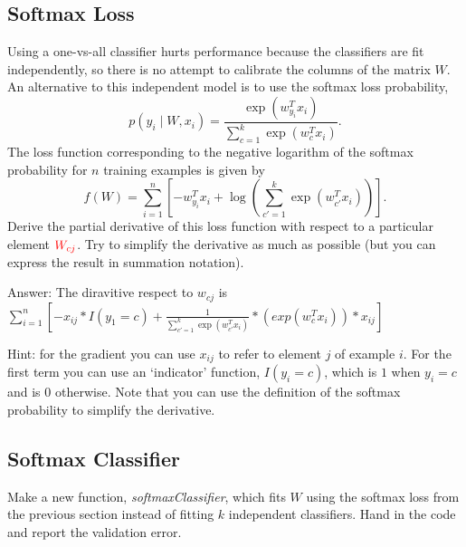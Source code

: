 \documentclass{article}
\def\ans#1{\par\gre{Answer: #1}}
\def\blu#1{{\color{blu}#1}}
\def\gre#1{{\color{gre}#1}}
\def\red#1{{\color{red}#1}}
\def\cond{\; | \;}
\begin{document}
\subsection{Softmax Loss}

Using a one-vs-all classifier hurts performance because the classifiers are fit independently, so there is no attempt to calibrate the columns of the matrix $W$. An alternative to this independent model is to use the softmax loss probability,
\[
p(y_i \cond W, x_i) = \frac{\exp(w_{y_i}^Tx_i)}{\sum_{c=1}^k\exp(w_c^Tx_i)}.
\]
The loss function corresponding to the negative logarithm of the softmax probability for $n$ training examples is given by
\[
f(W) = \sum_{i=1}^n \left[-w_{y_i}^Tx_i + \log\left(\sum_{c' = 1}^k \exp(w_{c'}^Tx_i)\right)\right].
\]
\blu{Derive the partial derivative of this loss function with respect to a particular element $\red{W_{cj}}$}. Try to simplify the derivative as much as possible (but you can express the result in summation notation).
\ans{The diravitive respect to $w_{cj}$ is $\sum _{i=1}^n [-x_{ij}*I(y_1=c) + \frac{1}{\sum_{c' = 1}^k \exp(w_{c'}^Tx_i)}* (exp(w_{c}^Tx_i))*x_{ij} ]$}

Hint: for the gradient you can use $x_{ij}$ to refer to element $j$ of example $i$. For the first term you can use an `indicator' function, $I(y_i = c)$, which is $1$ when $y_i = c$ and is $0$ otherwise. Note that you can use the definition of the softmax probability to simplify the derivative.



\subsection{Softmax Classifier}

Make a new function, \emph{softmaxClassifier}, which fits $W$ using the softmax loss from the previous section  instead of fitting $k$ independent classifiers. \blu{Hand in the code and report the validation error}.
\end{document}
